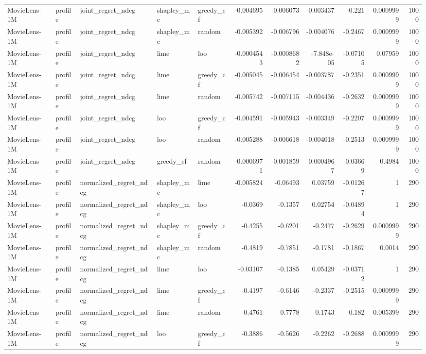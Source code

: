 \begin{table}[t]
\begin{tabular}{lllllrrrrrr}
MovieLens-1M & profile & joint\_regret\_ndcg & shapley\_mc & greedy\_cf & -0.004695 & -0.006073 & -0.003437 & -0.221 & 0.0009999 & 1000 \\
MovieLens-1M & profile & joint\_regret\_ndcg & shapley\_mc & random & -0.005392 & -0.006796 & -0.004076 & -0.2467 & 0.0009999 & 1000 \\
MovieLens-1M & profile & joint\_regret\_ndcg & lime & loo & -0.0004543 & -0.0008682 & -7.848e-05 & -0.07105 & 0.07959 & 1000 \\
MovieLens-1M & profile & joint\_regret\_ndcg & lime & greedy\_cf & -0.005045 & -0.006454 & -0.003787 & -0.2351 & 0.0009999 & 1000 \\
MovieLens-1M & profile & joint\_regret\_ndcg & lime & random & -0.005742 & -0.007115 & -0.004436 & -0.2632 & 0.0009999 & 1000 \\
MovieLens-1M & profile & joint\_regret\_ndcg & loo & greedy\_cf & -0.004591 & -0.005943 & -0.003349 & -0.2207 & 0.0009999 & 1000 \\
MovieLens-1M & profile & joint\_regret\_ndcg & loo & random & -0.005288 & -0.006618 & -0.004018 & -0.2513 & 0.0009999 & 1000 \\
MovieLens-1M & profile & joint\_regret\_ndcg & greedy\_cf & random & -0.0006971 & -0.001859 & 0.0004967 & -0.03669 & 0.4984 & 1000 \\
MovieLens-1M & profile & normalized\_regret\_ndcg & shapley\_mc & lime & -0.005824 & -0.06493 & 0.03759 & -0.01267 & 1 & 290 \\
MovieLens-1M & profile & normalized\_regret\_ndcg & shapley\_mc & loo & -0.0369 & -0.1357 & 0.02754 & -0.04894 & 1 & 290 \\
MovieLens-1M & profile & normalized\_regret\_ndcg & shapley\_mc & greedy\_cf & -0.4255 & -0.6201 & -0.2477 & -0.2629 & 0.0009999 & 290 \\
MovieLens-1M & profile & normalized\_regret\_ndcg & shapley\_mc & random & -0.4819 & -0.7851 & -0.1781 & -0.1867 & 0.0014 & 290 \\
MovieLens-1M & profile & normalized\_regret\_ndcg & lime & loo & -0.03107 & -0.1385 & 0.05429 & -0.03712 & 1 & 290 \\
MovieLens-1M & profile & normalized\_regret\_ndcg & lime & greedy\_cf & -0.4197 & -0.6146 & -0.2337 & -0.2515 & 0.0009999 & 290 \\
MovieLens-1M & profile & normalized\_regret\_ndcg & lime & random & -0.4761 & -0.7778 & -0.1743 & -0.182 & 0.005399 & 290 \\
MovieLens-1M & profile & normalized\_regret\_ndcg & loo & greedy\_cf & -0.3886 & -0.5626 & -0.2262 & -0.2688 & 0.0009999 & 290 \\

\end{tabular}
\end{table}
